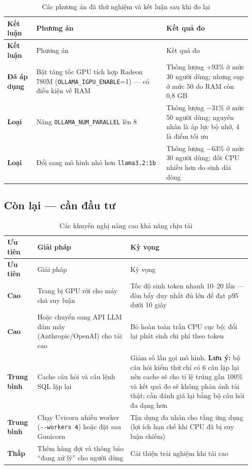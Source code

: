 \documentclass[12pt,a4paper]{article}
\begin{document}
\begin{longtable}{>{\bfseries}p{2.4cm}p{8.1cm}p{3.6cm}}
\caption{Các phương án đã thử nghiệm và kết luận sau khi đo lại}\\
\toprule
Kết luận & Phương án & Kết quả đo\\
\midrule
\endfirsthead
\toprule
Kết luận & Phương án & Kết quả đo\\
\midrule
\endhead
\textcolor{successgreen}{Đã áp dụng} & Bật tăng tốc GPU tích hợp Radeon 780M
(\texttt{OLLAMA\_IGPU\_ENABLE}=1) --- có điều kiện về RAM &
Thông lượng $+93\%$ ở mức 30 người dùng; nhưng sụp ở mức 50 do RAM còn 0,8 GB\\
\textcolor{dangerred}{Loại} & Nâng \texttt{OLLAMA\_NUM\_PARALLEL} lên 8 &
Thông lượng $-31\%$ ở mức 50 người dùng; nguyên nhân là áp lực bộ nhớ, 4 là điểm tối ưu\\
\textcolor{dangerred}{Loại} & Đổi sang mô hình nhỏ hơn \texttt{llama3.2:1b} &
Thông lượng $-63\%$ ở mức 30 người dùng; đốt CPU nhiều hơn do sinh dài dòng\\
\bottomrule
\end{longtable}

\subsection{Còn lại --- cần đầu tư}

\begin{longtable}{>{\bfseries}p{1.9cm}p{8.6cm}p{3.6cm}}
\caption{Các khuyến nghị nâng cao khả năng chịu tải}\\
\toprule
Ưu tiên & Giải pháp & Kỳ vọng\\
\midrule
\endfirsthead
\toprule
Ưu tiên & Giải pháp & Kỳ vọng\\
\midrule
\endhead
\textcolor{dangerred}{Cao} & Trang bị GPU rời cho máy chủ suy luận &
Tốc độ sinh token nhanh 10--20 lần --- đòn bẩy duy nhất đủ lớn để đạt p95 dưới 10 giây\\
\textcolor{dangerred}{Cao} & Hoặc chuyển sang API LLM đám mây (Anthropic/OpenAI) cho tải cao &
Bỏ hoàn toàn trần CPU cục bộ; đổi lại phát sinh chi phí theo token\\
\textcolor{warnorange}{Trung bình} & Cache câu hỏi và câu lệnh SQL lặp lại &
Giảm số lần gọi mô hình. \textbf{Lưu ý:} bộ câu hỏi kiểm thử chỉ có 6 câu lặp lại
nên cache sẽ cho tỉ lệ trúng gần 100\% và kết quả đo sẽ không phản ánh tải thật;
cần đánh giá lại bằng bộ câu hỏi đa dạng hơn\\
\textcolor{warnorange}{Trung bình} & Chạy Uvicorn nhiều worker (\texttt{-{}-workers 4}) hoặc đặt sau Gunicorn &
Tận dụng đa nhân cho tầng ứng dụng (lợi ích hạn chế khi CPU đã bị suy luận chiếm)\\
\textcolor{successgreen}{Thấp} & Thêm hàng đợi và thông báo ``đang xử lý'' cho người dùng &
Cải thiện trải nghiệm khi tải cao\\
\bottomrule
\end{longtable}
\end{document}
